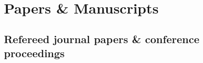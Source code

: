 \documentclass[letterpaper]{article}
\renewenvironment{itemize}{
  \begin{list}{}{
    \setlength{\leftmargin}{1.5em}
  }
}{
  \end{list}
}
\begin{document}
\section*{Papers \& Manuscripts}




\subsection*{Refereed journal papers \& conference proceedings}
\end{document}
